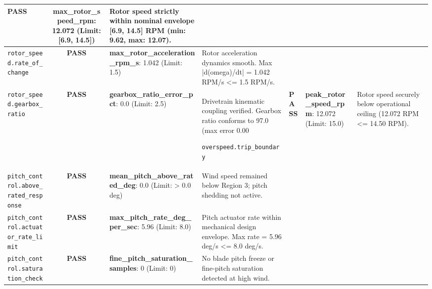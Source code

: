 \documentclass[10pt,a4paper]{article}
\begin{document}
\begin{table}[h!]
\begin{tabularx}{\textwidth}{lcp{3.5cm}X}
        \textcolor{PassGreen}{\textbf{PASS}}
     & 
    \textbf{max_rotor_speed_rpm}: 12.072 (Limit: [6.9, 14.5]) & 
    Rotor speed strictly within nominal envelope [6.9, 14.5] RPM (min: 9.62, max: 12.07). \\
    \midrule
    
    \texttt{rotor_speed.rate_of_change} & 
    
        \textcolor{PassGreen}{\textbf{PASS}}
     & 
    \textbf{max_rotor_acceleration_rpm_s}: 1.042 (Limit: 1.5) & 
    Rotor acceleration dynamics smooth. Max |d(omega)/dt| = 1.042 RPM/s <= 1.5 RPM/s. \\
    \midrule
    
    \texttt{rotor_speed.gearbox_ratio} & 
    
        \textcolor{PassGreen}{\textbf{PASS}}
     & 
    \textbf{gearbox_ratio_error_pct}: 0.0 (Limit: 2.5) & 
    Drivetrain kinematic coupling verified. Gearbox ratio conforms to 97.0 (max error 0.00%
    \midrule
    
    \texttt{overspeed.trip_boundary} & 
    
        \textcolor{PassGreen}{\textbf{PASS}}
     & 
    \textbf{peak_rotor_speed_rpm}: 12.072 (Limit: 15.0) & 
    Rotor speed securely below operational ceiling (12.072 RPM <= 14.50 RPM). \\
    \midrule
    
    \texttt{pitch_control.above_rated_response} & 
    
        \textcolor{PassGreen}{\textbf{PASS}}
     & 
    \textbf{mean_pitch_above_rated_deg}: 0.0 (Limit: > 0.0 deg) & 
    Wind speed remained below Region 3; pitch shedding not active. \\
    \midrule
    
    \texttt{pitch_control.actuator_rate_limit} & 
    
        \textcolor{PassGreen}{\textbf{PASS}}
     & 
    \textbf{max_pitch_rate_deg_per_sec}: 5.96 (Limit: 8.0) & 
    Pitch actuator rate within mechanical design envelope. Max rate = 5.96 deg/s <= 8.0 deg/s. \\
    \midrule
    
    \texttt{pitch_control.saturation_check} & 
    
        \textcolor{PassGreen}{\textbf{PASS}}
     & 
    \textbf{fine_pitch_saturation_samples}: 0 (Limit: 0) & 
    No blade pitch freeze or fine-pitch saturation detected at high wind. \\
    \midrule
    

\end{tabularx}
\end{table}
\end{document}
